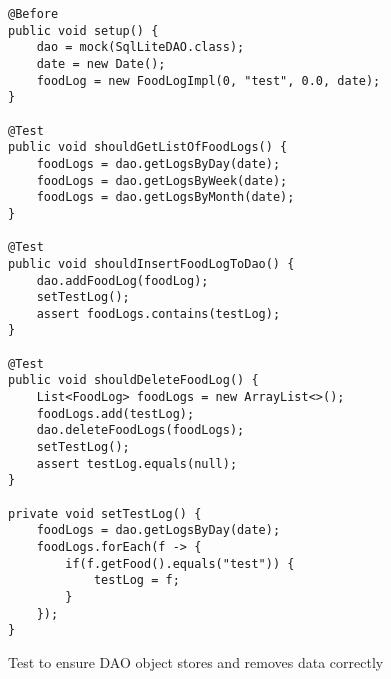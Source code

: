 \begin{figure}[h]
\caption{Test to ensure DAO object stores and removes data correctly}
\label{lst:test3}
\begin{lstlisting}[style=Java]
@Before
public void setup() {
    dao = mock(SqlLiteDAO.class);
    date = new Date();
    foodLog = new FoodLogImpl(0, "test", 0.0, date);
}

@Test
public void shouldGetListOfFoodLogs() {
    foodLogs = dao.getLogsByDay(date);
    foodLogs = dao.getLogsByWeek(date);
    foodLogs = dao.getLogsByMonth(date);
}

@Test
public void shouldInsertFoodLogToDao() {
    dao.addFoodLog(foodLog);
    setTestLog();
    assert foodLogs.contains(testLog);
}

@Test
public void shouldDeleteFoodLog() {
    List<FoodLog> foodLogs = new ArrayList<>();
    foodLogs.add(testLog);
    dao.deleteFoodLogs(foodLogs);
    setTestLog();
    assert testLog.equals(null);
}

private void setTestLog() {
    foodLogs = dao.getLogsByDay(date);
    foodLogs.forEach(f -> {
        if(f.getFood().equals("test")) {
            testLog = f;
        }
    });
}
\end{lstlisting}
\end{figure}

\clearpage